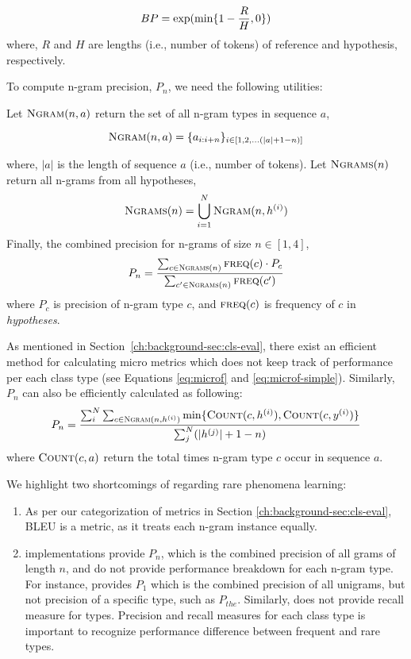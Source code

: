$$ BP = \exp(\min\{1-\frac{R}{H},\space 0\}) $$ 
where, $R$ and $H$ are lengths (i.e., number of tokens) of reference and hypothesis, respectively.
 
To compute n-gram precision, $P_n$, we need the following utilities: 

Let $\textsc{Ngram}(n, a)$ return the set of all n-gram types in sequence $a$, 
 
 $$\textsc{Ngram}(n,a) = \{ a_{i:i+n} \}_{i \in [1, 2, ... (|a|+1-n)]}$$
 
where, $|a|$ is the length of sequence $a$ (i.e., number of tokens). Let $\textsc{Ngrams}(n)$ return all n-grams from all hypotheses,
$$\textsc{Ngrams}(n) = \bigcup_{i=1}^N \textsc{Ngram}(n, h^{(i)})$$
Finally, the combined precision for n-grams of size $n \in [1, 4]$, 
\begin{equation}\label{eq:bleu-precision}
  P_n = \frac{\sum_{c \in \textsc{Ngrams}(n)} \textsc{freq}(c) \cdot P_c} {\sum_{c' \in \textsc{Ngrams}(n)} \textsc{freq}(c')} 
\end{equation}
where $P_c$ is precision of n-gram type $c$, and $\textsc{freq}(c)$ is frequency of $c$ in \textit{hypotheses}.

As mentioned in Section~\ref{ch:background-sec:cls-eval}, there exist an efficient method for calculating micro metrics which does not keep track of performance per each class type (see Equations \ref{eq:microf} and \ref{eq:microf-simple}). 
Similarly, $P_n$ can also be efficiently calculated as following:
\begin{equation}\label{eq:bleu-precision-simple}
P_n = \frac{\sum_i^N \sum_{{c} \in \textsc{Ngram}(n, h^{(i)})}  \min\{\textsc{Count}(c, h^{(i)}), \textsc{Count}(c, y^{(i)}) \}}{ \sum_j^N (|h^{(j)}| + 1 - n)}     
\end{equation}
where $\textsc{Count}(c, a)$ return the total times n-gram type $c$ occur in sequence $a$.

We highlight two shortcomings of \bleu{} regarding rare phenomena learning:
\begin{enumerate}
    \item As per our categorization of metrics in Section \ref{ch:background-sec:cls-eval}, BLEU is a  metric, as it treats each n-gram instance equally. 

    \item \bleu{} implementations provide $P_n$, which is the combined precision of all grams of length $n$, and do not provide performance breakdown for each n-gram type. For instance, \bleu{} provides $P_1$ which is the combined precision of all unigrams, but not precision of a specific type, such as $P_{the}$. 
    Similarly, \bleu{} does not provide recall measure for types. Precision and recall measures for each class type is important to recognize performance difference between frequent and rare types.
\end{enumerate}

